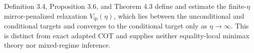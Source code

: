 Definition 3.4, Proposition 3.6, and Theorem 4.3 define and estimate the finite-\(\eta\) mirror-penalized relaxation \(V_{\mathrm{ip}}(\eta)\), which lies between the unconditional and conditional targets and converges to the conditional target only as \(\eta\to\infty\). This is distinct from exact adapted COT and supplies neither equality-local minimax theory nor mixed-regime inference.